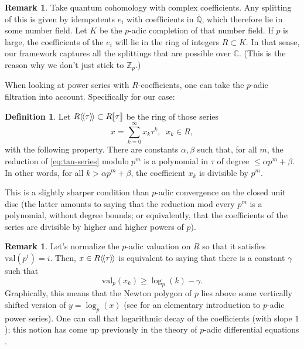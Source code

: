 \documentclass[JEP,XML,SOM,Unicode,NoFloatCountersInSection,published]{cedram}
\newcommand{\llbracket}{[\![}
\newcommand{\rrbracket}{]\!]}
\theoremstyle{plain}
\theoremstyle{definition}
\newtheorem{definition}[theorem]{Definition}
\newtheorem{remark}[theorem]{Remark}
\newcommand{\bC}{{\mathbb C}}
\newcommand{\bQ}{{\mathbb Q}}
\newcommand{\bZ}{{\mathbb Z}}
\newcommand{\lla}{\langle\hspace{-0.3ex}\langle}
\newcommand{\rra}{\rangle\hspace{-0.3ex}\rangle}
\begin{document}
\begin{remark} \label{th:coefficient-transfer}
Take quantum cohomology with complex coefficients. Any splitting of this is given by idempotents $e_i$ with coefficients in $\bar{\bQ}$, which therefore lie in some number field. Let $K$ be the $p$-adic completion of that number field. If $p$ is large, the coefficients of the $e_i$ will lie in the ring of integers $R \subset K$. In that sense, our framework captures all the splittings that are possible over $\bC$. (This is the reason why we don't just stick to $\bZ_p$.)
\end{remark}

When looking at power series with $R$-coefficients, one can take the $p$-adic filtration into account. Specifically for our case:

\begin{definition} \label{th:log-decay}
Let $R\lla\tau\rra \subset R\llbracket \tau\rrbracket$ be the ring of those series
\begin{equation} \label{eq:tau-series}
x = \sum_{k=0}^\infty x_k \tau^k, \;\; x_k \in R,
\end{equation}
with the following property. There are constants $\alpha,\beta$ such that, for all $m$, the reduction of \eqref{eq:tau-series} modulo $p^m$ is a polynomial in $\tau$ of degree $\leq \alpha p^m + \beta$. In other words, for all $k> \alpha p^m + \beta$, the coefficient $x_k$ is divisible by $p^m$.
\end{definition}

This is a slightly sharper condition than $p$-adic convergence on the closed unit disc (the latter amounts to saying that the reduction mod every $p^m$ is a polynomial, without degree bounds; or equivalently, that the coefficients of the series are divisible by higher and higher powers of $p$).

\begin{remark}
Let's normalize the $p$-adic valuation on $R$ so that it satisfies \hbox{$\mathrm{val}(p^i) \!=\! i$}. Then, $x \in R\lla \tau\rra$ is equivalent to saying that there is a constant $\gamma$ such that
\begin{equation*}
\mathrm{val}_p(x_k) \geq \log\nolimits_p(k) - \gamma.
\end{equation*}
Graphically, this means that the Newton polygon of $p$ lies above some vertically shifted version of $y = \log_p(x)$ (see \eg \cite{conrad-series} for an elementary introduction to $p$-adic power series). One can call that logarithmic decay of the coefficients (with slope $1$); this notion has come up previously in the theory of $p$-adic differential equations \cite{dwork-sperber91}.
\end{remark}
\end{document}
